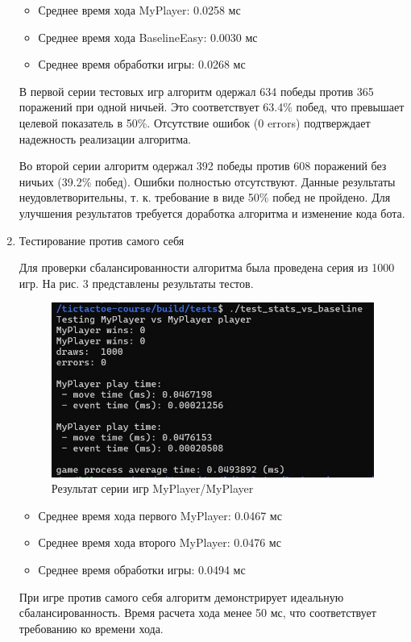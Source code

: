 \documentclass[a4paper]{article}
\begin{document}
\begin{enumerate}
	\begin{itemize}
		\item Среднее время хода MyPlayer: 0.0258 мс
		\item Среднее время хода BaselineEasy: 0.0030 мс
		\item Среднее время обработки игры: 0.0268 мс
	\end{itemize}
	
	В первой серии тестовых игр алгоритм одержал 634 победы против 365 поражений при одной ничьей. Это соответствует 63.4\% побед, что превышает целевой показатель в 50\%. Отсутствие ошибок (0 errors) подтверждает надежность реализации алгоритма.
	
	Во второй серии алгоритм одержал 392 победы против 608 поражений без ничьих (39.2\% побед). Ошибки полностью отсутствуют. Данные результаты неудовлетворительны, т. к. требование в виде 50\% побед не пройдено. Для улучшения результатов требуется доработка алгоритма и изменение кода бота.
	
	\item Тестирование против самого себя
	
	Для проверки сбалансированности алгоритма была проведена серия из 1000 игр. На рис. 3 представлены результаты тестов.
	
	\begin{figure}[H]
		\centering
		\includegraphics{3}
		\caption{Результат серии игр MyPlayer/MyPlayer}
	\end{figure}
	
	\begin{itemize}
		\item Среднее время хода первого MyPlayer: 0.0467 мс
		\item Среднее время хода второго MyPlayer: 0.0476 мс
		\item Среднее время обработки игры: 0.0494 мс
	\end{itemize}
	
	При игре против самого себя алгоритм демонстрирует идеальную сбалансированность. Время расчета хода менее 50 мс, что соответствует требованию ко времени хода.
\end{enumerate}
\clearpage
\end{document}
